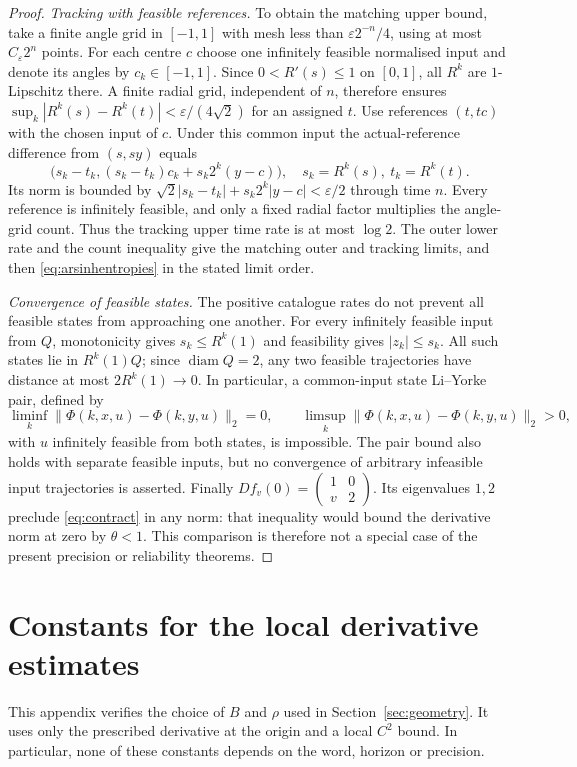 \documentclass[11pt]{amsart}
\theoremstyle{definition}
\theoremstyle{remark}
\newcommand{\diam}{\operatorname{diam}}
\numberwithin{equation}{section}
\begin{document}
\begin{proof}
\smallskip
\emph{Tracking with feasible references.}
To obtain the matching upper bound, take a finite angle grid in $[-1,1]$
with mesh less than $\varepsilon2^{-n}/4$, using at most
$C_\varepsilon2^n$ points. For each centre $c$ choose one
infinitely feasible normalised input and denote its angles by
$c_k\in[-1,1]$. Since $0<R'(s)\le1$ on $[0,1]$, all
$R^k$ are $1$-Lipschitz there. A finite radial grid, independent
of $n$, therefore ensures $\sup_k|R^k(s)-R^k(t)|<\varepsilon/(4\sqrt2)$
for an assigned $t$. Use references $(t,tc)$ with the chosen
input of $c$. Under this common input the actual-reference difference
from $(s,sy)$ equals
\[
\bigl(s_k-t_k,(s_k-t_k)c_k+s_k2^k(y-c)\bigr),
\quad s_k=R^k(s),\ t_k=R^k(t).
\]
Its norm is bounded by
$\sqrt2|s_k-t_k|+s_k2^k|y-c|<\varepsilon/2$ through time $n$.
Every reference is infinitely feasible, and only a fixed radial
factor multiplies the angle-grid count. Thus the tracking upper
time rate is at most $\log2$. The outer lower rate and the
count inequality give the matching outer and tracking limits,
and then \eqref{eq:arsinhentropies} in the stated limit order.

\smallskip
\emph{Convergence of feasible states.}
The positive catalogue rates do not prevent all feasible states
from approaching one another. For every infinitely feasible input from $Q$,
monotonicity gives
$s_k\le R^k(1)$ and feasibility gives $|z_k|\le s_k$.
All such states lie in $R^k(1)Q$; since $\diam Q=2$, any two
feasible trajectories have distance at most $2R^k(1)\to0$.
In particular, a common-input state Li--Yorke pair, defined by
\[
\liminf_k\|\Phi(k,x,u)-\Phi(k,y,u)\|_2=0,
\qquad \limsup_k\|\Phi(k,x,u)-\Phi(k,y,u)\|_2>0,
\]
with $u$ infinitely feasible from both states, is impossible.
The pair bound also holds with separate feasible inputs, but no
convergence of arbitrary infeasible input trajectories is asserted.
Finally $Df_v(0)=\left(\begin{smallmatrix}1&0\\v&2\end{smallmatrix}\right)$.
Its eigenvalues $1,2$ preclude \eqref{eq:contract} in any norm:
that inequality would bound the derivative norm at zero by
$\theta<1$. This comparison is therefore not a special case
of the present precision or reliability theorems.
\end{proof}

\section{Constants for the local derivative estimates}
\label{app:localconstants}
This appendix verifies the choice of $B$ and $\rho$ used in
Section~\ref{sec:geometry}. It uses only the prescribed derivative
at the origin and a local $C^2$ bound. In particular, none of these
constants depends on the word, horizon or precision.
\end{document}
